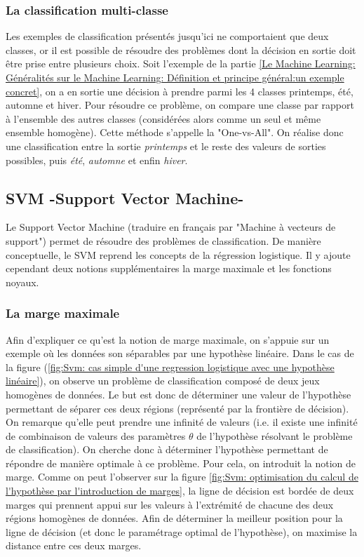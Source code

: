 \subsubsection{La classification multi-classe}
\label{Le Machine Learning: Les différents algorithmes: La regression logistique: La classification multi-classe}
Les exemples de classification présentés jusqu'ici ne comportaient que deux classes, or il est possible de résoudre des problèmes dont la décision en sortie doit être prise entre plusieurs choix. Soit l'exemple de la partie \ref{Le Machine Learning: Généralités sur le Machine Learning: Définition et principe général:un exemple concret}, on a en sortie une décision à prendre parmi les 4 classes printemps, été, automne et hiver. Pour résoudre ce problème, on compare une classe par rapport à l'ensemble des autres classes (considérées alors comme un seul et même ensemble homogène). Cette méthode s'appelle la "One-vs-All". On réalise donc une classification entre la sortie \emph{printemps} et le reste des valeurs de sorties possibles, puis \emph{été}, \emph{automne} et enfin \emph{hiver}.


\subsection{SVM -Support Vector Machine-}
\label{Le Machine Learning: Les différents algorithmes: SVM}
Le Support Vector Machine (traduire en français par "Machine à vecteurs de support") permet de résoudre des problèmes de classification. De manière conceptuelle, le SVM reprend les concepts de la régression logistique. Il y ajoute cependant deux notions supplémentaires la marge maximale et les fonctions noyaux.

\subsubsection{La marge maximale}
\label{Le Machine Learning: Les différents algorithmes: SVM: la marge maximale}
Afin d'expliquer ce qu'est la notion de marge maximale, on s'appuie sur un exemple où les données son séparables par une hypothèse linéaire. Dans le cas de la figure (\ref{fig:Svm: cas simple d'une regression logistique avec une hypothèse linéaire}), on observe un problème de classification composé de deux jeux homogènes de données. Le but est donc de déterminer une valeur de l'hypothèse permettant de séparer ces deux régions (représenté par la frontière de décision). On remarque qu'elle peut prendre une infinité de valeurs (i.e. il existe une infinité de combinaison de valeurs des paramètres $\theta$ de l'hypothèse résolvant le problème de classification). On cherche donc à déterminer l'hypothèse permettant de répondre de manière optimale à ce problème. Pour cela, on introduit la notion de marge. Comme on peut l'observer sur la figure \ref{fig:Svm: optimisation du calcul de l'hypothèse par l'introduction de marges}, la ligne de décision est bordée de deux marges qui prennent appui sur les valeurs à l'extrémité de chacune des deux régions homogènes de données. Afin de déterminer la meilleur position pour la ligne de décision (et donc le paramétrage optimal de l'hypothèse), on maximise la distance entre ces deux marges. 


